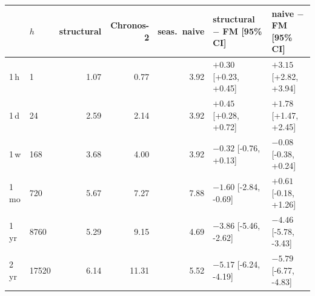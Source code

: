 \begin{tabular}{llrrrll}
\toprule
 & $h$ & structural & Chronos-2 & seas.\ naive & structural $-$ FM [95\% CI] & naive $-$ FM [95\% CI] \\
\midrule
1\,h & 1 & 1.07 & 0.77 & 3.92 & $+0.30$ [+0.23, +0.45] & $+3.15$ [+2.82, +3.94] \\
1\,d & 24 & 2.59 & 2.14 & 3.92 & $+0.45$ [+0.28, +0.72] & $+1.78$ [+1.47, +2.45] \\
1\,w & 168 & 3.68 & 4.00 & 3.92 & $-0.32$ [-0.76, +0.13] & $-0.08$ [-0.38, +0.24] \\
1\,mo & 720 & 5.67 & 7.27 & 7.88 & $-1.60$ [-2.84, -0.69] & $+0.61$ [-0.18, +1.26] \\
1\,yr & 8760 & 5.29 & 9.15 & 4.69 & $-3.86$ [-5.46, -2.62] & $-4.46$ [-5.78, -3.43] \\
2\,yr & 17520 & 6.14 & 11.31 & 5.52 & $-5.17$ [-6.24, -4.19] & $-5.79$ [-6.77, -4.83] \\
\bottomrule
\end{tabular}
